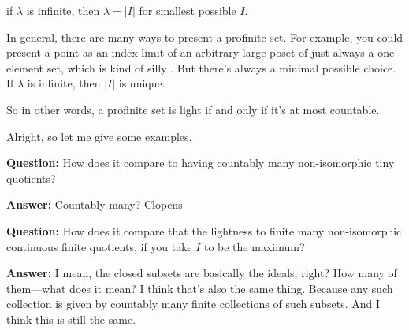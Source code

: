 \begin{remark}
if $\lambda$ is infinite, then $\lambda = |I|$ for smallest possible $I$.

In general, there are many ways to present a profinite set. For example, you could present a point as an index limit of an arbitrary large poset of just always a one-element set, which is kind of silly . But there's always a minimal possible choice. If $\lambda$ is infinite, then $|I|$ is unique.

So in other words, a profinite set is light if and only if it's at most countable.

\end{remark}


Alright, so let me give some examples.

\textbf{Question:} How does it compare to having countably many non-isomorphic tiny quotients? 

\textbf{Answer:} Countably many? Clopens

\textbf{Question:} How does it compare that the lightness to  finite many non-isomorphic continuous finite quotients, if you take $I$ to be the maximum? 

\textbf{Answer:} I mean, the closed subsets are basically the ideals, right? How many of them---what does it mean? I think that's also the same thing. Because any such collection is given by countably many finite collections of such subsets. And I think this is still the same.


